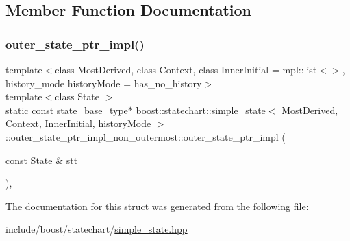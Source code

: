\subsection{Member Function Documentation}
\mbox{\label{structboost_1_1statechart_1_1simple__state_1_1outer__state__ptr__impl__non__outermost_a86506e098d4882c19b5a15b560f672d5}} 
\subsubsection{\texorpdfstring{outer\+\_\+state\+\_\+ptr\+\_\+impl()}{outer\_state\_ptr\_impl()}}
{\footnotesize\ttfamily template$<$class Most\+Derived, class Context, class Inner\+Initial = mpl\+::list$<$$>$, history\+\_\+mode history\+Mode = has\+\_\+no\+\_\+history$>$ \\
template$<$class State $>$ \\
static const \mbox{\hyperlink{classboost_1_1statechart_1_1simple__state_ae4af81f8eae996cc418efa3387af0ef6}{state\+\_\+base\+\_\+type}}$\ast$ \mbox{\hyperlink{classboost_1_1statechart_1_1simple__state}{boost\+::statechart\+::simple\+\_\+state}}$<$ Most\+Derived, Context, Inner\+Initial, history\+Mode $>$\+::outer\+\_\+state\+\_\+ptr\+\_\+impl\+\_\+non\+\_\+outermost\+::outer\+\_\+state\+\_\+ptr\+\_\+impl (\begin{DoxyParamCaption}\item[{const State \&}]{stt }\end{DoxyParamCaption})\hspace{0.3cm}{\ttfamily [inline]}, {\ttfamily [static]}}



The documentation for this struct was generated from the following file\+:\begin{DoxyCompactItemize}
\item 
include/boost/statechart/\mbox{\hyperlink{simple__state_8hpp}{simple\+\_\+state.\+hpp}}\end{DoxyCompactItemize}
